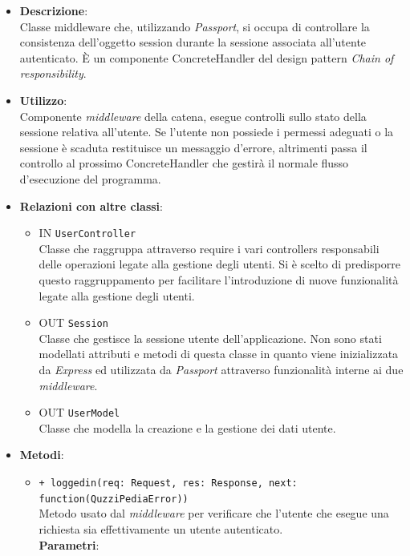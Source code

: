 \begin{itemize}
	\item 
	\textbf{Descrizione}:\\
	Classe middleware che, utilizzando \textit{Passport}, si occupa di controllare la consistenza dell'oggetto session durante la sessione associata all'utente autenticato. È un componente ConcreteHandler del design pattern \textit{Chain of responsibility}.
	\item
	\textbf{Utilizzo}:\\
	Componente \textit{middleware} della catena, esegue controlli sullo stato della sessione relativa all'utente. Se l'utente non possiede i permessi adeguati o la sessione è scaduta restituisce un messaggio d'errore, altrimenti passa il controllo al prossimo ConcreteHandler che gestirà il normale flusso d'esecuzione del programma.
	\item
	\textbf{Relazioni con altre classi}:
	\begin{itemize}
		\item
		IN \texttt{UserController} \\
		Classe che raggruppa attraverso require i vari controllers responsabili delle operazioni legate alla gestione degli utenti. Si è scelto di predisporre questo raggruppamento per facilitare l'introduzione di nuove funzionalità legate alla gestione degli utenti.
		\item
		OUT \texttt{Session} \\
		Classe che gestisce la sessione utente dell'applicazione. Non sono stati modellati attributi e metodi di questa classe in quanto viene inizializzata da \textit{Express} ed utilizzata da \textit{Passport} attraverso funzionalità interne ai due \textit{middleware}.
		\item
		OUT \texttt{UserModel} \\
		Classe che modella la creazione e la gestione dei dati utente.
	\end{itemize}
	\item
	\textbf{Metodi}:
	\begin{itemize}
		\item
		\texttt{+ loggedin(req: Request, res: Response, next: function(QuzziPediaError))} \\
		Metodo usato dal \textit{middleware} per verificare che l'utente che esegue una richiesta sia effettivamente un utente autenticato. \\
		\textbf{Parametri}:
		 \begin{itemize}

\end{itemize}
\end{itemize}
\end{itemize}
